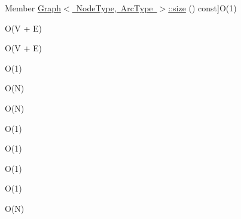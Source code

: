 \begin{DoxyRefList}
%
Member \mbox{\hyperlink{classGraph_af9593d4a5ff4274efaf429cb4f9e57cc}{Graph$<$ Node\+Type, Arc\+Type $>$\+:\+:size}} () const]O(1)  
\item[\label{BigOh__BigOh000090}%
\Hypertarget{BigOh__BigOh000090}%
Member \mbox{\hyperlink{classGraph_a1fe5121d6528fdea3f243321b3fa3a49}{Graph$<$ Node\+Type, Arc\+Type $>$\+:\+:to\+String}} () const]O(V + E)  
\item[\label{BigOh__BigOh000041}%
\Hypertarget{BigOh__BigOh000041}%
Member \mbox{\hyperlink{classGraph_af5a604e5e9e4d68dbc10b312e59f678f}{Graph$<$ Node\+Type, Arc\+Type $>$\+:\+:$\sim$\+Graph}} ()]O(V + E)  
\item[\label{BigOh__BigOh000103}%
\Hypertarget{BigOh__BigOh000103}%
Member \mbox{\hyperlink{classVector_ab901606bf3a8019c986f0cf9a9f298dc}{Vector$<$ Value\+Type $>$\+:\+:add}} (const Value\+Type \&value)]O(1)  
\item[\label{BigOh__BigOh000104}%
\Hypertarget{BigOh__BigOh000104}%
Member \mbox{\hyperlink{classVector_a7e05c14d67a60defeb6723b5704967a6}{Vector$<$ Value\+Type $>$\+:\+:add\+All}} (const Vector$<$ Value\+Type $>$ \&v)]O(\+N)  
\item[\label{BigOh__BigOh000105}%
\Hypertarget{BigOh__BigOh000105}%
Member \mbox{\hyperlink{classVector_a36067964c5c7f8b7934682f5c3be49c6}{Vector$<$ Value\+Type $>$\+:\+:add\+All}} (std\+::initializer\+\_\+list$<$ Value\+Type $>$ list)]O(\+N)  
\item[\label{BigOh__BigOh000107}%
\Hypertarget{BigOh__BigOh000107}%
Member \mbox{\hyperlink{classVector_adc761c91bdacd01bed5c96e25fd9486a}{Vector$<$ Value\+Type $>$\+:\+:back}} () const]O(1)  
\item[\label{BigOh__BigOh000106}%
\Hypertarget{BigOh__BigOh000106}%
Member \mbox{\hyperlink{classVector_a2bad145b40a82c36986f67610313658d}{Vector$<$ Value\+Type $>$\+:\+:back}} ()]O(1)  
\item[\label{BigOh__BigOh000153}%
\Hypertarget{BigOh__BigOh000153}%
Member \mbox{\hyperlink{classVector_a0c62c15c8ed609e7e5e9518cf5f5c712}{Vector$<$ Value\+Type $>$\+:\+:begin}} () const]O(1)  
\item[\label{BigOh__BigOh000108}%
\Hypertarget{BigOh__BigOh000108}%
Member \mbox{\hyperlink{classVector_ac8bb3912a3ce86b15842e79d0b421204}{Vector$<$ Value\+Type $>$\+:\+:clear}} ()]O(1)  
\item[\label{BigOh__BigOh000109}%
\Hypertarget{BigOh__BigOh000109}%
Member \mbox{\hyperlink{classVector_a6fbc1a150987e7e5320d244a3baeb560}{Vector$<$ Value\+Type $>$\+:\+:contains}} (const Value\+Type \&value) const]O(\+N)  

\end{DoxyRefList}
